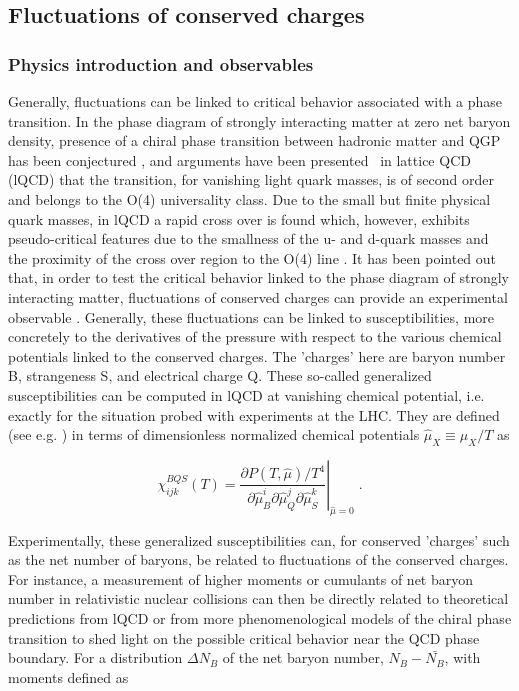 \subsection{Fluctuations of conserved charges} 
\subsubsection{Physics introduction and observables}

Generally, fluctuations can be linked to critical behavior associated with a phase transition. In the phase diagram of strongly interacting matter at zero net baryon density, presence of a chiral phase transition between hadronic matter and QGP has been conjectured \cite{Pisarski:1983ms}, and arguments have been presented~\cite{Ejiri:2009ac,Ding:2018auz} in lattice QCD (lQCD) that the transition, for vanishing light quark masses, is of second order and belongs to the O(4) universality class. Due to the small but finite physical quark masses, in lQCD a rapid cross over is found \cite{Aoki:2006we,Aoki:2009sc,Borsanyi:2010bp,Bazavov:2011nk,Bhattacharya:2014ara}   which, however, exhibits pseudo-critical features due to the smallness of the u- and d-quark masses and the proximity of the cross over region to the O(4) line \cite{Ejiri:2009ac,Ding:2013lfa}. It has been pointed out that, in order to test the critical behavior linked to the phase diagram of strongly interacting matter, fluctuations of conserved charges can provide an experimental observable \cite{Ejiri:2005wq,Bazavov:2017dus,Friman:2011pf,Bazavov:2012jq}. Generally, these fluctuations can be linked to susceptibilities, more concretely to the derivatives of the pressure with respect to the various chemical potentials linked to the conserved charges. The 'charges' here are baryon number B, strangeness S, and electrical charge Q. These so-called generalized susceptibilities can be computed in lQCD at vanishing chemical potential, i.e. exactly for the situation probed with experiments at the LHC. They are defined (see e.g. \cite{Bazavov:2012jq,Bellwied:2015lba}) in terms of dimensionless normalized chemical potentials \(\hat{\mu}_X\equiv \mu_X/T \) \: as

\begin{equation}
\chi_{ijk}^{BQS}(T) = \left.
\frac{\partial P(T,\hat{\mu})/T^4}{\partial\hat{\mu}_B^i \partial\hat{\mu}_Q^j \partial\hat{\mu}_S^k}\right|_{\hat{\mu}=0} \; .
\label{suscept}
\end{equation} 

\noindent Experimentally, these generalized susceptibilities can, for conserved 'charges' such as the net number of baryons, be related to fluctuations of the conserved charges. For instance, a measurement of higher moments or cumulants of net baryon number in relativistic nuclear collisions can then be directly related \cite{Karsch:2010ck,Skokov:2012ds,Karsch:2012wm,Karsch:2017mvg,Borsanyi:2013hza,Borsanyi:2014ewa} to theoretical predictions from lQCD or from more phenomenological models  of the chiral phase transition  \cite{Almasi:2017bhq,Parotto:2018pwx}  to shed light on the possible critical behavior near the QCD phase boundary. For a distribution $\Delta N_B$ of the net baryon number, $N_B - \bar{N_B}$, with moments defined as 

